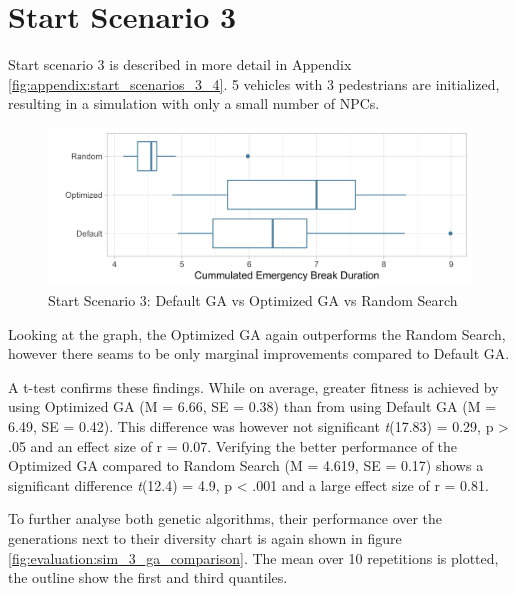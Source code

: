 \section{Start Scenario 3}
\label{sect:evaluation:scenario_3}
Start scenario 3 is described in more detail in Appendix \ref{fig:appendix:start_scenarios_3_4}. 5 vehicles with 3 pedestrians are initialized, resulting in a simulation with only a small number of NPCs.

\begin{figure}[ht] 
	\label{fig:evaluation:sim_3_comparison}
	\includegraphics[width=1\linewidth]{simulations/evaluation/plots/sim_3_comparison}
	\caption{Start Scenario 3: Default GA vs Optimized GA vs Random Search}
\end{figure}

Looking at the graph, the Optimized GA again outperforms the Random Search, however there seams to be only marginal improvements compared to Default GA. 

A t-test confirms these findings. While on average, greater fitness is achieved by using Optimized GA (M = 6.66, SE = 0.38) than from using Default GA (M = 6.49, SE = 0.42). This difference was however not significant \textit{t}(17.83) = 0.29, p > .05 and an effect size of r = 0.07.
Verifying the better performance of the Optimized GA compared to Random Search (M = 4.619, SE = 0.17) shows a significant difference \textit{t}(12.4) = 4.9, p < .001 and a large effect size of r = 0.81.

To further analyse both genetic algorithms, their performance over the generations next to their diversity chart is again shown in figure \ref{fig:evaluation:sim_3_ga_comparison}. The mean over 10 repetitions is plotted, the outline show the first and third quantiles.


